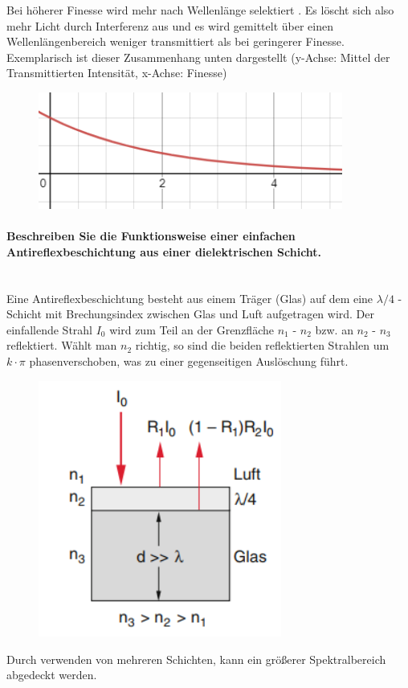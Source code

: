 \documentclass[a4paper, 11pt, ngerman, parskip=half-]{scrartcl}
\newcommand{\myparagraph}[1]{\paragraph{#1}\mbox{}\\}
\begin{document}
    Bei höherer Finesse wird mehr nach Wellenlänge \glqq selektiert \grqq. Es löscht sich also mehr Licht durch Interferenz aus und es wird gemittelt über einen Wellenlängenbereich weniger
    transmittiert als bei geringerer Finesse. Exemplarisch ist dieser Zusammenhang unten dargestellt (y-Achse: Mittel der Transmittierten Intensität, x-Achse: Finesse)
    \begin{figure}[H]
        \centering
        \includegraphics[width=10cm]{image/18_Interferenz/Finesse_gegen_Transmission.png}
    \end{figure}

    \myparagraph{Beschreiben Sie die Funktionsweise einer einfachen Antireflexbeschichtung aus einer
        dielektrischen Schicht.}
    Eine Antireflexbeschichtung besteht aus einem Träger (Glas) auf dem eine $\lambda/4$ - Schicht mit Brechungsindex zwischen Glas und Luft aufgetragen wird. Der einfallende Strahl
$I_0$ wird zum Teil an der Grenzfläche $n_1$ - $n_2$ bzw. an $n_2$ - $n_3$ reflektiert. Wählt man $n_2$ richtig, so sind die beiden reflektierten Strahlen um $k \cdot \pi$ phasenverschoben,
    was zu einer gegenseitigen Auslöschung führt.
    \begin{figure}[H]
        \centering
        \includegraphics[width=8cm]{image/18_Interferenz/Antireflexionsbeschichtung.png}
    \end{figure}
    Durch verwenden von mehreren Schichten, kann ein größerer Spektralbereich abgedeckt werden.
    \newpage
\end{document}
